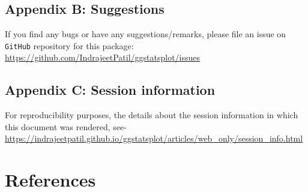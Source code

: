 \documentclass[
]{article}
\begin{document}
\hypertarget{appendix-b-suggestions}{%
\subsection{Appendix B: Suggestions}\label{appendix-b-suggestions}}

If you find any bugs or have any suggestions/remarks, please file an issue on
\texttt{GitHub} repository for this package:
\url{https://github.com/IndrajeetPatil/ggstatsplot/issues}

\hypertarget{appendix-c-session-information}{%
\subsection{Appendix C: Session information}\label{appendix-c-session-information}}

For reproducibility purposes, the details about the session information in which
this document was rendered, see-
\url{https://indrajeetpatil.github.io/ggstatsplot/articles/web_only/session_info.html}

\newpage

\hypertarget{references}{%
\section*{References}\label{references}}
\end{document}
